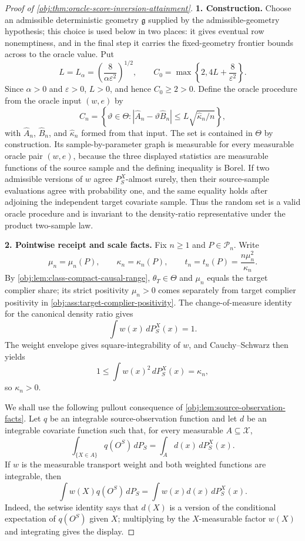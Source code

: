 \begin{proof}[Proof of \cref{obj:thm:oracle-score-inversion-attainment}]
\textbf{1. Construction.}
Choose an admissible deterministic geometry \(\mathfrak g\) supplied by the admissible-geometry hypothesis; this choice is used below in two places: it gives eventual row nonemptiness, and in the final step it carries the fixed-geometry frontier bounds across to the oracle value. Put
\[
L=L_\alpha=\left(\frac{8}{\alpha\varepsilon^2}\right)^{1/2},
\qquad
C_0=\max\left\{2,4L+\frac8{\varepsilon^2}\right\}.
\]
Since \(\alpha>0\) and \(\varepsilon>0\), \(L>0\), and hence \(C_0\ge2>0\). Define the oracle procedure from the oracle input \((w,e)\) by
\[
C_n
=
\left\{\vartheta\in\Theta:
\left|\widehat A_n-\vartheta\widehat B_n\right|
\le
L\sqrt{\widehat\kappa_n/n}
\right\},
\]
with \(\widehat A_n\), \(\widehat B_n\), and \(\widehat\kappa_n\) formed from that input. The set is contained in \(\Theta\) by construction. Its sample-by-parameter graph is measurable for every measurable oracle pair \((w,e)\), because the three displayed statistics are measurable functions of the source sample and the defining inequality is Borel. If two admissible versions of \(w\) agree \(P_S^X\)-almost surely, then their source-sample evaluations agree with probability one, and the same equality holds after adjoining the independent target covariate sample. Thus the random set is a valid oracle procedure and is invariant to the density-ratio representative under the product two-sample law. %

\textbf{2. Pointwise receipt and scale facts.}
Fix \(n\ge1\) and \(P\in\mathcal P_n\). Write
\[
\mu_n=\mu_n(P),\qquad
\kappa_n=\kappa_n(P),\qquad
t_n=t_n(P)=\frac{n\mu_n^2}{\kappa_n}.
\]
By \cref{obj:lem:class-compact-causal-range}, \(\theta_T\in\Theta\) and \(\mu_n\) equals the target complier share; its strict positivity \(\mu_n>0\) comes separately from target complier positivity in \cref{obj:ass:target-complier-positivity}. The change-of-measure identity for the canonical density ratio gives
\[
\int w(x)\,dP_S^X(x)=1.
\]
The weight envelope gives square-integrability of \(w\), and Cauchy--Schwarz then yields
\[
1\le \int w(x)^2\,dP_S^X(x)=\kappa_n,
\]
so \(\kappa_n>0\).

We shall use the following pullout consequence of \cref{obj:lem:source-observation-facts}. Let \(q\) be an integrable source-observation function and let \(d\) be an integrable covariate function such that, for every measurable \(A\subseteq\mathcal X\),
\[
\int_{\{X\in A\}}q(O^S)\,dP_S
=
\int_A d(x)\,dP_S^X(x).
\]
If \(w\) is the measurable transport weight and both weighted functions are integrable, then
\[
\int w(X)q(O^S)\,dP_S
=
\int w(x)d(x)\,dP_S^X(x).
\]
Indeed, the setwise identity says that \(d(X)\) is a version of the conditional expectation of \(q(O^S)\) given \(X\); multiplying by the \(X\)-measurable factor \(w(X)\) and integrating gives the display.


\end{proof}
